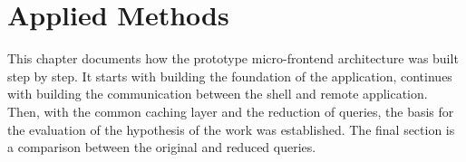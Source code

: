 \chapter{Applied Methods}\label{chapter:applied-methods}

This chapter documents how the prototype micro-frontend architecture was built step by step. It starts with building the foundation of the application, continues with building the communication between the shell and remote application. Then, with the common caching layer and the reduction of queries, the basis for the evaluation of the hypothesis of the work was established. The final section is a comparison between the original and reduced queries.









